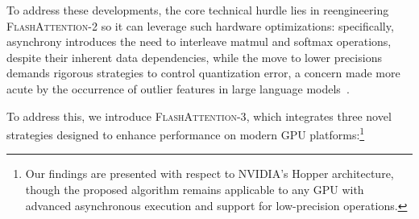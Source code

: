 To address these developments, the core technical hurdle lies in reengineering \textsc{FlashAttention-2} so it can leverage such hardware optimizations: specifically, asynchrony introduces the need to interleave matmul and softmax operations, despite their inherent data dependencies, while the move to lower precisions demands rigorous strategies to control quantization error, a concern made more acute by the occurrence of outlier features in large language models~\citep{dettmers2208llm, sun2024massive}.

To address this, we introduce \textsc{FlashAttention-3}, which integrates three novel strategies designed to enhance performance on modern GPU platforms:\footnote{Our findings are presented with respect to NVIDIA's Hopper architecture, though the proposed algorithm remains applicable to any GPU with advanced asynchronous execution and support for low-precision operations.}

